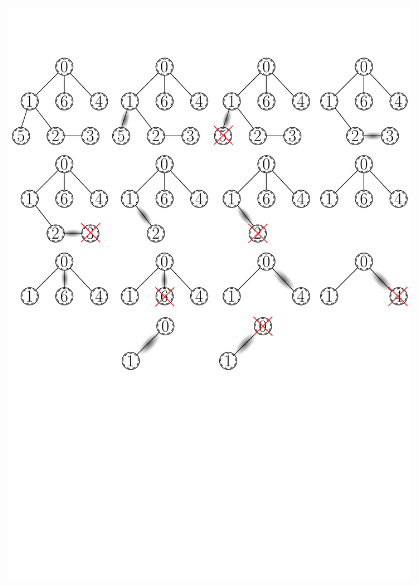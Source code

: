 \begin{figure}
\centering
\includegraphics[width=0.95\textwidth]{sample_interaction}
\end{figure}


